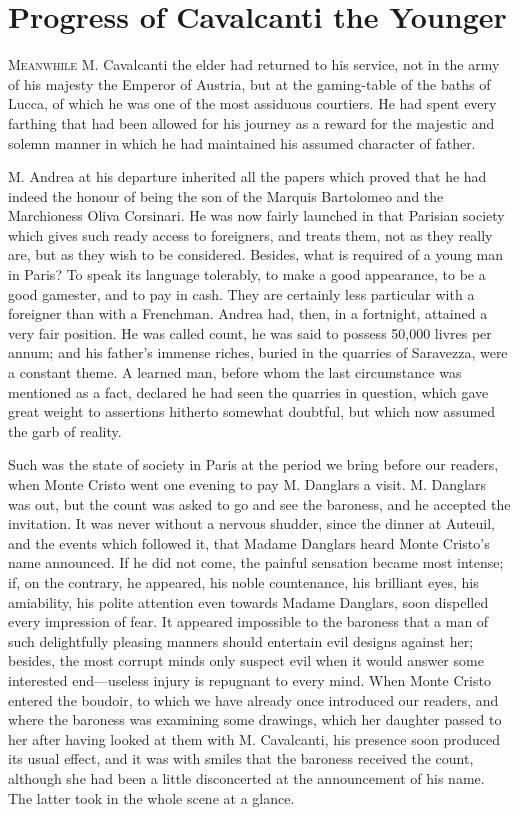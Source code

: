 \chapter{Progress of Cavalcanti the Younger} 

 \lettrine{M}{eanwhile} M. Cavalcanti the elder had returned to his service, not in the army of his majesty the Emperor of Austria, but at the gaming-table of the baths of Lucca, of which he was one of the most assiduous courtiers. He had spent every farthing that had been allowed for his journey as a reward for the majestic and solemn manner in which he had maintained his assumed character of father. 

 M. Andrea at his departure inherited all the papers which proved that he had indeed the honour of being the son of the Marquis Bartolomeo and the Marchioness Oliva Corsinari. He was now fairly launched in that Parisian society which gives such ready access to foreigners, and treats them, not as they really are, but as they wish to be considered. Besides, what is required of a young man in Paris? To speak its language tolerably, to make a good appearance, to be a good gamester, and to pay in cash. They are certainly less particular with a foreigner than with a Frenchman. Andrea had, then, in a fortnight, attained a very fair position. He was called count, he was said to possess 50,000 livres per annum; and his father's immense riches, buried in the quarries of Saravezza, were a constant theme. A learned man, before whom the last circumstance was mentioned as a fact, declared he had seen the quarries in question, which gave great weight to assertions hitherto somewhat doubtful, but which now assumed the garb of reality. 

 Such was the state of society in Paris at the period we bring before our readers, when Monte Cristo went one evening to pay M. Danglars a visit. M. Danglars was out, but the count was asked to go and see the baroness, and he accepted the invitation. It was never without a nervous shudder, since the dinner at Auteuil, and the events which followed it, that Madame Danglars heard Monte Cristo's name announced. If he did not come, the painful sensation became most intense; if, on the contrary, he appeared, his noble countenance, his brilliant eyes, his amiability, his polite attention even towards Madame Danglars, soon dispelled every impression of fear. It appeared impossible to the baroness that a man of such delightfully pleasing manners should entertain evil designs against her; besides, the most corrupt minds only suspect evil when it would answer some interested end—useless injury is repugnant to every mind.  When Monte Cristo entered the boudoir, to which we have already once introduced our readers, and where the baroness was examining some drawings, which her daughter passed to her after having looked at them with M. Cavalcanti, his presence soon produced its usual effect, and it was with smiles that the baroness received the count, although she had been a little disconcerted at the announcement of his name. The latter took in the whole scene at a glance. 

